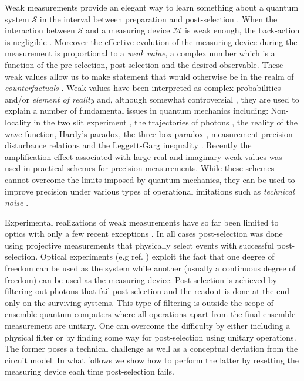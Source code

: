 \documentclass[aps,pra,12pt,onecolumn,showpacs,superscriptaddress,floatfix,footinbib,subfigure]{revtex4}
\def\es{{\mathcal{S}}}
\def\md{{\mathcal{M}}}
\begin{document}
Weak measurements provide an elegant way to learn something about a quantum system $\es$  in the interval between preparation and post-selection \cite{Aharonov1991}. When the interaction between $\es$ and a measuring device $\md$ is weak enough, the back-action is negligible \cite{Tollaksen2010}. Moreover the effective evolution of the measuring device during the measurement is proportional to a \emph{weak value}, a complex number which is a function of the pre-selection, post-selection and the desired observable. These weak values allow us to make statement that would otherwise be in the realm of \emph{counterfactuals} \cite{Aharonov2002,Molmer2001}. Weak values have been interpreted  as complex probabilities \cite{Hofmann2013} and/or  \emph{element of reality} \cite{Vaidman1996} and, although somewhat controversial \cite{Peres1989, Aharonov1989, Leggett1989}, they are  used to explain a number of fundamental issues in quantum mechanics including: Non-locality in the two slit experiment \cite{Tollaksen2010}, the trajectories of photons  \cite{Kocsis2011}, the reality of the wave function\cite{Lundeen2011}, Hardy's paradox\cite{Aharonov2002,Molmer2001,Lundeen2009}, the three box paradox \cite{Aharonov1991,Vaidman1996,Resch2004},   measurement precision-disturbance relations  \cite{Rozema2012,Lund2010} and the Leggett-Garg inequality \cite{Goggin2011,Williams2008,Groen2013}.  Recently the amplification effect associated with large real and imaginary weak values was  used in   practical schemes for precision measurements.  While these schemes  cannot  overcome the limits imposed by quantum mechanics, they can be used to improve precision under  various types of operational imitations  such as \emph{technical noise} \cite{Jordan2013}.

Experimental realizations of weak measurements  have so far been limited to optics with only a few recent exceptions  \cite{Shomroni2013, Groen2013}. In all cases post-selection was done using projective measurements that physically select events with successful  post-selection.  Optical experiments (e.g ref. \cite{Ritchie1991}) exploit the fact that one degree of freedom can be used as the system while another (usually a continuous degree of freedom) can be used as the measuring device.  Post-selection is  achieved  by filtering out photons that fail post-selection and the readout is done at the end only on the surviving systems. This type of filtering is outside the scope of ensemble quantum computers where all operations apart from the final ensemble measurement are unitary. One can overcome the difficulty by either  including a physical filter or by finding some way for post-selection using unitary operations. The former poses a technical challenge  as well as a conceptual deviation from the circuit model. In what follows we show how to perform the latter by resetting the measuring device each time post-selection fails.
\end{document}

